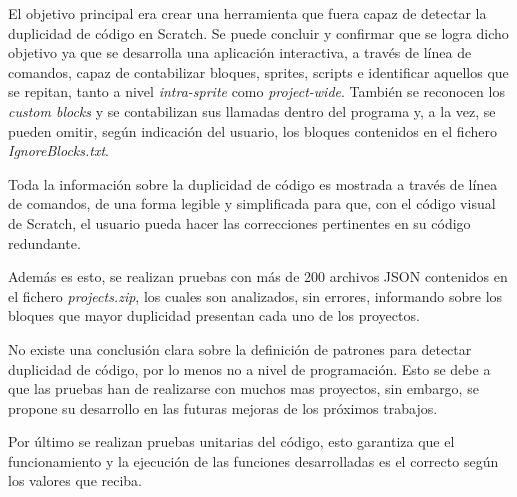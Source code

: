 \documentclass[a4paper, 12pt]{book}
\begin{document}




El objetivo principal era crear una herramienta que fuera capaz de detectar la duplicidad de código en Scratch. Se puede concluir y confirmar que se logra dicho objetivo ya que se desarrolla una aplicación interactiva, a través de línea de comandos, capaz de contabilizar bloques, sprites, scripts e identificar aquellos que se repitan, tanto a nivel \textit{intra-sprite} como \textit{project-wide}. También se reconocen los \textit{custom blocks} y se contabilizan sus llamadas dentro del programa y, a la vez, se pueden omitir, según indicación del usuario, los bloques contenidos en el fichero \textit{IgnoreBlocks.txt}.

Toda la información sobre la duplicidad de código es mostrada a través de línea de comandos, de una forma legible y simplificada para que, con el código visual de Scratch, el usuario pueda hacer las correcciones pertinentes en su código redundante. 

Además es esto, se realizan pruebas con más de 200 archivos JSON contenidos en el fichero \textit{projects.zip}, los cuales son analizados, sin errores, informando sobre los bloques que mayor duplicidad presentan cada uno de los proyectos.

No existe una conclusión clara sobre la definición de patrones para detectar duplicidad de código, por lo menos no a nivel de programación. Esto se debe a que las pruebas han de realizarse con muchos mas proyectos, sin embargo, se propone su desarrollo en las futuras mejoras de los próximos trabajos.

Por último se realizan pruebas unitarias del código, esto garantiza que el funcionamiento y la ejecución de las funciones desarrolladas es el correcto según los valores que reciba.
\end{document}
